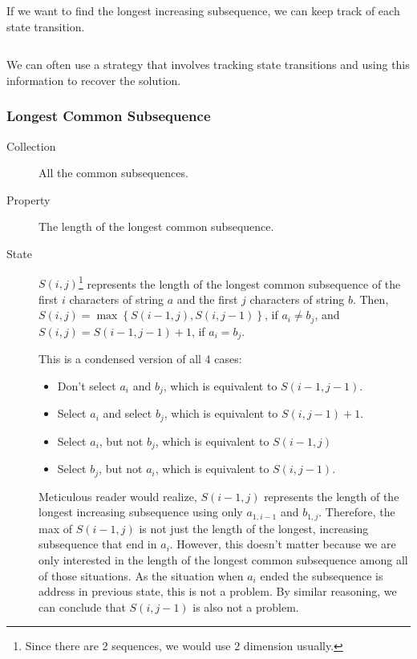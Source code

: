 \documentclass{article}
\begin{document}
If we want to find the longest increasing subsequence, we can keep track of each state transition.

\begin{center}
	\inputminted{cpp}{src/find-longest-increase-subsequence.cpp}
\end{center}

We can often use a strategy that involves tracking state transitions and using this information to recover the solution.

\subsubsection{Longest Common Subsequence}

\begin{description}
	\item[Collection] All the common subsequences.
	\item[Property] The length of the longest common subsequence.
	\item[State] $S(i, j)$\footnote{Since there are 2 sequences, we would use 2 dimension usually.} represents the length of the longest common subsequence of the first $i$ characters of string $a$ and the first $j$ characters of string $b$. Then, $S(i, j) = \max \left\{S(i - 1, j), S(i, j - 1)\right\}$, if $a_i \neq b_j$, and $S(i, j) = S(i - 1, j - 1) + 1$, if $a_i = b_j$.

		This is a condensed version of all 4 cases:
		\begin{itemize}
			\item Don't select $a_i$ and $b_j$, which is equivalent to $S(i - 1, j - 1) $.
			\item Select $a_i$ and select $b_j$, which is equivalent to $S(i, j - 1) + 1$.
			\item Select $a_i$, but not $b_j$, which is equivalent to $S(i - 1, j)$
			\item Select $b_j$, but not $a_i$, which is equivalent to $S(i, j - 1)$.
		\end{itemize}

		Meticulous reader would realize, $S(i - 1, j)$ represents the length of the longest increasing subsequence using only $a_{1, i - 1}$ and $b_{1, j}$. Therefore, the max of $S(i - 1, j)$ is not just the length of the longest, increasing subsequence that end in $a_i$. However, this doesn't matter because we are only interested in the length of the longest common subsequence among all of those situations. As the situation when $a_i$ ended the subsequence is address in previous state, this is not a problem. By similar reasoning, we can conclude that $S(i, j - 1)$ is also not a problem.
\end{description}
\end{document}
